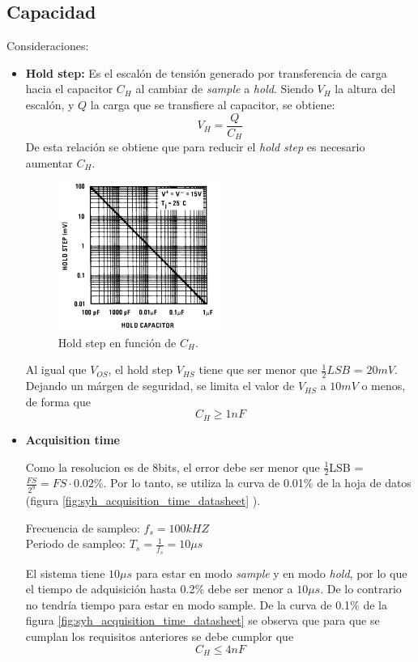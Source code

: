 \documentclass[../../ASSD_TP1_G7.tex]{subfiles}
\begin{document}
\subsection{Capacidad}
Consideraciones:
\begin{itemize}
	\item \textbf{Hold step:}
	Es el escal\'on de tensi\'on generado por transferencia de carga hacia el capacitor $C_H$ al cambiar de \textit{sample} a \textit{hold}. Siendo $V_H$ la altura del escal\'on, y $Q$ la carga que se transfiere al capacitor, se obtiene: 
	\[V_H = \frac{Q}{C_H}\]
	De esta relaci\'on se obtiene que para reducir el \textit{hold step} es necesario aumentar $C_H$.

		\begin{figure}[H]
			\centering
			\includegraphics[width = 0.5\textwidth]{figures/hold_step_datasheet.png}
			\caption{Hold step en funci\'on de $C_H$.}
			\label{fig:syh_hold_step_datasheet}
		\end{figure}

Al igual que $V_{OS}$, el hold step $V_{HS}$ tiene que ser menor que $\frac{1}{2} LSB$ = $20mV$. Dejando un m\'argen de seguridad, se limita el valor de $V_{HS}$ a $10mV$ o menos, de forma que \[ C_H \geqslant 1nF \]
	
	
	\item\textbf{Acquisition time}
	
Como la resolucion es de 8bits, el error debe ser menor que $\frac{1}{2}$LSB = $\frac{FS}{2^9} = FS \cdot 0.02\% $. Por lo tanto, se utiliza la curva de 0.01\% de la hoja de datos (figura \ref{fig:syh_acquisition_time_datasheet} ).

Frecuencia de sampleo: $f_s = 100kHZ $ \\
Periodo de sampleo: $T_s = \frac{1}{f_s} = 10\mu s$


El sistema tiene $10\mu s$ para estar en modo \textit{sample} y en modo \textit{hold}, por lo que el tiempo de adquisici\'on hasta 0.2\% debe ser menor a $10\mu s$. De lo contrario no tendr\'ia tiempo para estar en modo sample. De la curva de 0.1\% de la figura \ref{fig:syh_acquisition_time_datasheet} se observa que para que se cumplan los requisitos anteriores se debe cumplor que \[C_H \leqslant 4nF\]


\end{itemize}
\end{document}
